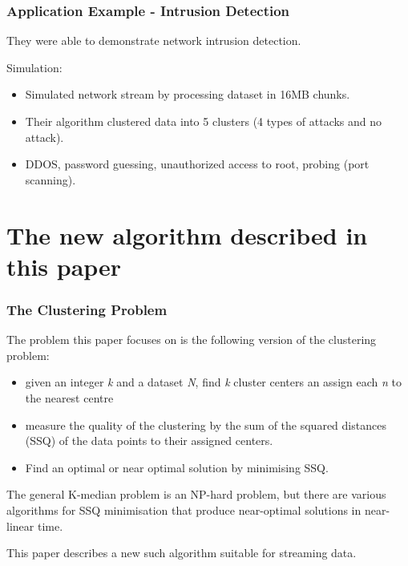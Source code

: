 \documentclass{beamer}
\begin{document}
\frame
{
  \frametitle{Application Example - Intrusion Detection}

  They were able to demonstrate network intrusion detection. \newline

  Simulation:
  \begin{itemize}
    \item Simulated network stream by processing dataset in 16MB chunks.
    \item Their algorithm clustered data into 5 clusters (4 types of attacks and no attack).
    \item DDOS, password guessing, unauthorized access to root, probing (port scanning). 
  \end{itemize}
}

\section{The new algorithm described in this paper}

\frame
{
  \frametitle{The Clustering Problem}

  The problem this paper focuses on is the following version of the
  clustering problem: 
  
  \begin{itemize}
  \item given an integer {\em k} and a dataset {\em N}, find {\em k}
    cluster centers an assign each {\em n} to the nearest centre
  \item measure the quality of the clustering by the sum of the
    squared distances (SSQ) of the data points to their assigned centers.
  \item Find an optimal or near optimal solution by minimising SSQ.
  \end{itemize}

  The general K-median problem is an NP-hard problem, but there are
  various algorithms for SSQ minimisation that produce near-optimal
  solutions in near-linear time.

  \bigskip
  This paper describes a new such algorithm suitable for streaming
  data.
  
}
\end{document}
